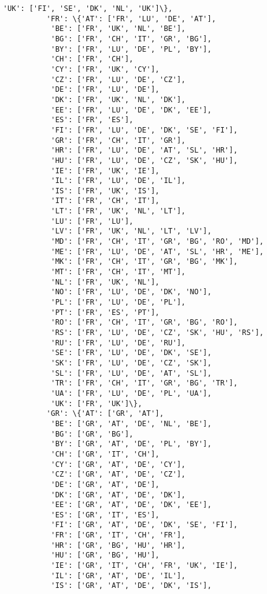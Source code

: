 \documentclass[11pt]{article}
\begin{document}
\begin{Verbatim}[commandchars=\\\{\}]
           'UK': ['FI', 'SE', 'DK', 'NL', 'UK']\},
          'FR': \{'AT': ['FR', 'LU', 'DE', 'AT'],
           'BE': ['FR', 'UK', 'NL', 'BE'],
           'BG': ['FR', 'CH', 'IT', 'GR', 'BG'],
           'BY': ['FR', 'LU', 'DE', 'PL', 'BY'],
           'CH': ['FR', 'CH'],
           'CY': ['FR', 'UK', 'CY'],
           'CZ': ['FR', 'LU', 'DE', 'CZ'],
           'DE': ['FR', 'LU', 'DE'],
           'DK': ['FR', 'UK', 'NL', 'DK'],
           'EE': ['FR', 'LU', 'DE', 'DK', 'EE'],
           'ES': ['FR', 'ES'],
           'FI': ['FR', 'LU', 'DE', 'DK', 'SE', 'FI'],
           'GR': ['FR', 'CH', 'IT', 'GR'],
           'HR': ['FR', 'LU', 'DE', 'AT', 'SL', 'HR'],
           'HU': ['FR', 'LU', 'DE', 'CZ', 'SK', 'HU'],
           'IE': ['FR', 'UK', 'IE'],
           'IL': ['FR', 'LU', 'DE', 'IL'],
           'IS': ['FR', 'UK', 'IS'],
           'IT': ['FR', 'CH', 'IT'],
           'LT': ['FR', 'UK', 'NL', 'LT'],
           'LU': ['FR', 'LU'],
           'LV': ['FR', 'UK', 'NL', 'LT', 'LV'],
           'MD': ['FR', 'CH', 'IT', 'GR', 'BG', 'RO', 'MD'],
           'ME': ['FR', 'LU', 'DE', 'AT', 'SL', 'HR', 'ME'],
           'MK': ['FR', 'CH', 'IT', 'GR', 'BG', 'MK'],
           'MT': ['FR', 'CH', 'IT', 'MT'],
           'NL': ['FR', 'UK', 'NL'],
           'NO': ['FR', 'LU', 'DE', 'DK', 'NO'],
           'PL': ['FR', 'LU', 'DE', 'PL'],
           'PT': ['FR', 'ES', 'PT'],
           'RO': ['FR', 'CH', 'IT', 'GR', 'BG', 'RO'],
           'RS': ['FR', 'LU', 'DE', 'CZ', 'SK', 'HU', 'RS'],
           'RU': ['FR', 'LU', 'DE', 'RU'],
           'SE': ['FR', 'LU', 'DE', 'DK', 'SE'],
           'SK': ['FR', 'LU', 'DE', 'CZ', 'SK'],
           'SL': ['FR', 'LU', 'DE', 'AT', 'SL'],
           'TR': ['FR', 'CH', 'IT', 'GR', 'BG', 'TR'],
           'UA': ['FR', 'LU', 'DE', 'PL', 'UA'],
           'UK': ['FR', 'UK']\},
          'GR': \{'AT': ['GR', 'AT'],
           'BE': ['GR', 'AT', 'DE', 'NL', 'BE'],
           'BG': ['GR', 'BG'],
           'BY': ['GR', 'AT', 'DE', 'PL', 'BY'],
           'CH': ['GR', 'IT', 'CH'],
           'CY': ['GR', 'AT', 'DE', 'CY'],
           'CZ': ['GR', 'AT', 'DE', 'CZ'],
           'DE': ['GR', 'AT', 'DE'],
           'DK': ['GR', 'AT', 'DE', 'DK'],
           'EE': ['GR', 'AT', 'DE', 'DK', 'EE'],
           'ES': ['GR', 'IT', 'ES'],
           'FI': ['GR', 'AT', 'DE', 'DK', 'SE', 'FI'],
           'FR': ['GR', 'IT', 'CH', 'FR'],
           'HR': ['GR', 'BG', 'HU', 'HR'],
           'HU': ['GR', 'BG', 'HU'],
           'IE': ['GR', 'IT', 'CH', 'FR', 'UK', 'IE'],
           'IL': ['GR', 'AT', 'DE', 'IL'],
           'IS': ['GR', 'AT', 'DE', 'DK', 'IS'],

\end{Verbatim}
\end{document}
